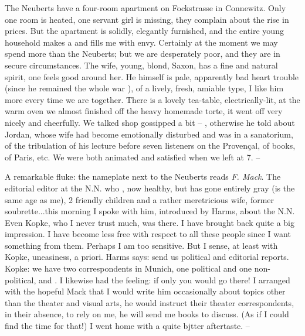 
The Neuberts have a four-room apartment on Fockstrasse in Connewitz. Only one room is heated, one servant girl is missing, they complain about the rise in prices. But the apartment is solidly, elegantly furnished, and the entire young household makes a  and fills me with envy. Certainly at the moment we may spend more than the Neuberts; but we are desperately poor, and they are in secure circumstances. The wife, young, blond, Saxon, has a fine and natural spirit, one feels good around her.  He himself is pale, apparently bad heart trouble (since he remained the whole war ), of a lively, fresh, amiable type, I like him more every time we are together. There is a lovely tea-table, electrically-lit, at the warm oven we almost finished off the heavy homemade torte, it went off very nicely and cheerfully. We talked shop gossipped a bit -- , otherwise he told about Jordan, whose wife had become emotionally disturbed and was in a sanatorium, of the tribulation of his lecture before seven listeners on the Provençal, of books, of Paris, etc. We were both animated and satisfied when we left at 7. -- \missing

A remarkable fluke: the nameplate next to the Neuberts reads \textit{F. Mack}. The editorial editor at the N.N. who , now healthy, but has gone entirely gray (is the same age as me), 2 friendly children and a rather meretricious wife, former soubrette...this morning I spoke with him, introduced by Harms, about the N.N. Even Kopke, who I never trust much, was there. I have brought back quite a big impression. I have become less free with respect to all these people since I want something from them. Perhaps I am too sensitive. But I sense, at least with Kopke, uneasiness,  a priori. Harms says: send us political and editorial reports. Kopke: we have two correspondents in Munich, one political and one non-political, and . I likewise had the feeling: if only you would go there! I arranged with the hopeful Mack that I would write him occasionally about topics other than the theater and visual arts, he would instruct their theater correspondents, in their absence, to rely on me, he will send me books to discuss. (As if I could find the time for that!) I went home with a quite bjtter aftertaste. --

\missing

